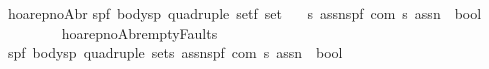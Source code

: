 \begin{isabellebody}
\isanewline
{\isachardoublequoteopen}{\isacharunderscore}hoarep{\isacharunderscore}noAbr{\isachardoublequoteclose}{\isacharcolon}{\isacharcolon}\isanewline
{\isachardoublequoteopen}{\isacharbrackleft}{\isacharparenleft}{\isacharprime}s{\isacharcomma}{\isacharprime}p{\isacharcomma}{\isacharprime}f{\isacharparenright}\ body{\isacharcomma}{\isacharparenleft}{\isacharprime}s{\isacharcomma}{\isacharprime}p{\isacharparenright}\ quadruple\ set{\isacharcomma}{\isacharprime}f\ set{\isacharcomma}\isanewline
\ \ \ {\isacharprime}s\ assn{\isacharcomma}{\isacharparenleft}{\isacharprime}s{\isacharcomma}{\isacharprime}p{\isacharcomma}{\isacharprime}f{\isacharparenright}\ com{\isacharcomma}\ {\isacharprime}s\ assn{\isacharbrackright}\ {\isacharequal}{\isachargreater}\ bool{\isachardoublequoteclose}\isanewline
\ \ \ {\isacharparenleft}{\isachardoublequoteopen}{\isacharparenleft}{}{\isacharunderscore}{\isacharcomma}{\isacharunderscore}{\isacharslash}{\isacharbar}{\isacharminus}{\isacharprime}{\isacharslash}{\isacharunderscore}\ {\isacharparenleft}{\isacharunderscore}{\isacharslash}\ {\isacharparenleft}{\isacharunderscore}{\isacharparenright}{\isacharslash}\ {\isacharunderscore}{\isacharparenright}{\isacharparenright}{\isachardoublequoteclose}\ {\isacharbrackleft}{}{}{\isacharcomma}{}{}{\isacharcomma}{}{}{\isacharcomma}{}{}{}{}{\isacharcomma}{}{}{\isacharcomma}{}{}{}{}{\isacharbrackright}{}{}{\isacharparenright}\isanewline
\isanewline
{\isachardoublequoteopen}{\isacharunderscore}hoarep{\isacharunderscore}noAbr{\isacharunderscore}emptyFaults{\isachardoublequoteclose}{\isacharcolon}{\isacharcolon}\isanewline
{\isachardoublequoteopen}{\isacharbrackleft}{\isacharparenleft}{\isacharprime}s{\isacharcomma}{\isacharprime}p{\isacharcomma}{\isacharprime}f{\isacharparenright}\ body{\isacharcomma}{\isacharparenleft}{\isacharprime}s{\isacharcomma}{\isacharprime}p{\isacharparenright}\ quadruple\ set{\isacharcomma}{\isacharprime}s\ assn{\isacharcomma}{\isacharparenleft}{\isacharprime}s{\isacharcomma}{\isacharprime}p{\isacharcomma}{\isacharprime}f{\isacharparenright}\ com{\isacharcomma}\ {\isacharprime}s\ assn{\isacharbrackright}\ {\isacharequal}{\isachargreater}\ bool{\isachardoublequoteclose}\isanewline
\ \ \ {\isacharparenleft}{\isachardoublequoteopen}{\isacharparenleft}{}{\isacharunderscore}{\isacharcomma}{\isacharunderscore}{\isacharslash}{\isacharbar}{\isacharminus}{\isacharparenleft}{\isacharunderscore}{\isacharslash}\ {\isacharparenleft}{\isacharunderscore}{\isacharparenright}{\isacharslash}\ {\isacharunderscore}{\isacharparenright}{\isacharparenright}{\isachardoublequoteclose}\ {\isacharbrackleft}{}{}{\isacharcomma}{}{}{\isacharcomma}{}{}{}{}{\isacharcomma}{}{}{\isacharcomma}{}{}{}{}{\isacharbrackright}{}{}{\isacharparenright}\isanewline

\end{isabellebody}
